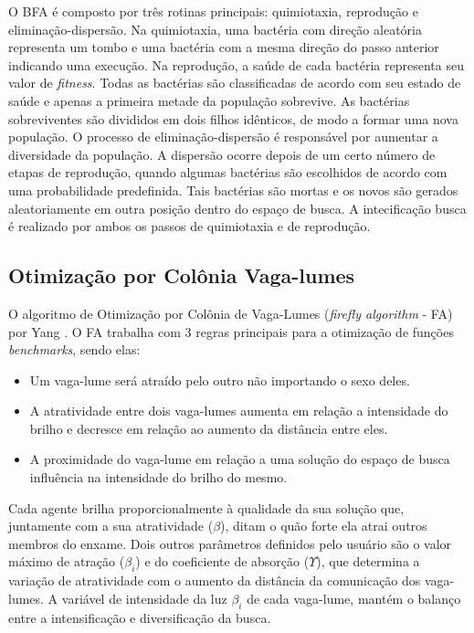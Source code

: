 O BFA é composto por três rotinas principais: quimiotaxia, reprodução e eliminação-dispersão. Na quimiotaxia, uma bactéria com direção aleatória representa um tombo e uma bactéria com a mesma direção do passo anterior indicando uma execução. Na reprodução, a saúde de cada bactéria representa seu valor de \textit{fitness}. Todas as bactérias são classificadas de acordo com seu estado de saúde e apenas a primeira metade da população sobrevive. As bactérias sobreviventes são divididos em dois filhos idênticos, de modo a formar uma nova população. O processo de eliminação-dispersão é responsável por aumentar a diversidade da população. A dispersão ocorre depois de um certo número de etapas de reprodução, quando algumas bactérias são escolhidos de acordo com uma probabilidade predefinida. Tais bactérias são mortas e os novos são gerados aleatoriamente em outra posição dentro do espaço de busca. A intecificação busca é realizado por ambos os passos de quimiotaxia e de reprodução.

\subsection{Otimização por Colônia Vaga-lumes}
\label{sec:firefly_algorithm}
O algoritmo de Otimização por Colônia de Vaga-Lumes (\textit{firefly algorithm} - FA) por Yang \cite{firefly}. O FA trabalha com 3 regras principais para a otimização de funções \textit{benchmarks}, sendo elas:

\begin{itemize}
\item Um vaga-lume será atraído pelo outro não importando o sexo deles.

\item A atratividade entre dois vaga-lumes aumenta em relação a intensidade do brilho e decresce em relação ao aumento da distância entre eles.

\item A proximidade do vaga-lume em relação a uma solução do espaço de busca influência na intensidade do brilho do mesmo.
\end{itemize}

Cada agente brilha proporcionalmente à qualidade da sua solução que, juntamente com a sua atratividade ($\beta$), ditam o quão forte ela atrai outros membros do enxame. Dois outros parâmetros definidos pelo usuário são o valor máximo de atração ($\beta_i$) e do coeficiente de absorção ($\Upsilon$), que determina a variação de atratividade com o aumento da distância da comunicação dos vaga-lumes. A variável
de intensidade da luz $\beta_i$ de cada vaga-lume, mantém o balanço entre a intensificação e diversificação da busca.

